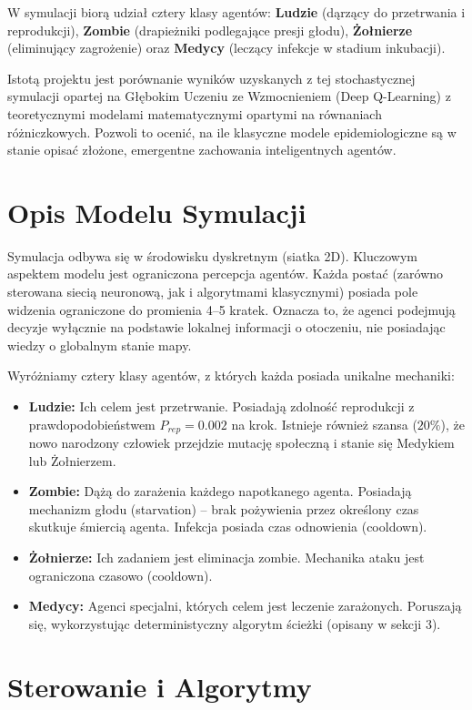 \documentclass[12pt, a4paper]{article}
\begin{document}
W symulacji biorą udział cztery klasy agentów: \textbf{Ludzie} (dąrzący do
przetrwania i reprodukcji), \textbf{Zombie} (drapieżniki podlegające presji
głodu), \textbf{Żołnierze} (eliminujący zagrożenie) oraz \textbf{Medycy}
(leczący infekcje w stadium inkubacji).

Istotą projektu jest porównanie wyników uzyskanych z tej stochastycznej
symulacji opartej na Głębokim Uczeniu ze Wzmocnieniem (Deep Q-Learning) z
teoretycznymi modelami matematycznymi opartymi na równaniach różniczkowych.
Pozwoli to ocenić, na ile klasyczne modele epidemiologiczne są w stanie opisać
złożone, emergentne zachowania inteligentnych agentów.

\section{Opis Modelu Symulacji}

Symulacja odbywa się w środowisku dyskretnym (siatka 2D). Kluczowym aspektem
modelu jest ograniczona percepcja agentów. Każda postać (zarówno sterowana
siecią neuronową, jak i algorytmami klasycznymi) posiada pole widzenia
ograniczone do promienia 4--5 kratek. Oznacza to, że agenci podejmują decyzje
wyłącznie na podstawie lokalnej informacji o otoczeniu, nie posiadając wiedzy o
globalnym stanie mapy.

Wyróżniamy cztery klasy agentów, z których każda posiada unikalne mechaniki:

\begin{itemize}
    \item \textbf{Ludzie:} Ich celem jest przetrwanie. Posiadają zdolność reprodukcji z prawdopodobieństwem $P_{rep} = 0.002$ na krok. Istnieje również szansa ($20\%$), że nowo narodzony człowiek przejdzie mutację społeczną i stanie się Medykiem lub Żołnierzem.
    \item \textbf{Zombie:} Dążą do zarażenia każdego napotkanego agenta. Posiadają mechanizm głodu (starvation) – brak pożywienia przez określony czas skutkuje śmiercią agenta. Infekcja posiada czas odnowienia (cooldown).
    \item \textbf{Żołnierze:} Ich zadaniem jest eliminacja zombie. Mechanika ataku jest ograniczona czasowo (cooldown).
    \item \textbf{Medycy:} Agenci specjalni, których celem jest leczenie zarażonych. Poruszają się, wykorzystując deterministyczny algorytm ścieżki (opisany w sekcji 3).
\end{itemize}

\section{Sterowanie i Algorytmy}
\end{document}
